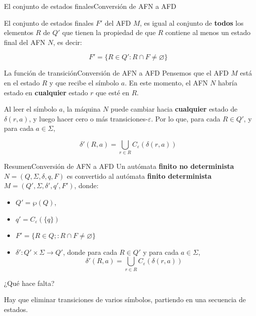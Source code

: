 \documentclass[spanish]{beamer}
\begin{document}
  \begin{frame}{El conjunto de estados finales}{Conversión de AFN a AFD}

    El conjunto de \alert{estados finales} $F'$ del AFD $M$, es igual al conjunto de \textbf{todos} los elementos $R$ de $Q'$ que tienen la propiedad de que $R$ contiene al menos un estado final del AFN $N$, es decir: \pause

    \[F'= \{R \in Q' : R \cap F \neq \varnothing\}\]
      
  \end{frame}

  \begin{frame}{La función de transición}{Conversión de AFN a AFD}
      Pensemos que el AFD $M$ está en el estado $R$ y que recibe el símbolo $a$.
      En este momento, el AFN $N$ habría estado en \textbf{cualquier} estado $r$ que esté en $R$. \pause

      \bigskip

      Al leer el símbolo $a$, la máquina $N$ puede cambiar hacia \textbf{cualquier} estado de $\delta(r,a)$, y luego hacer cero o más transiciones-$\varepsilon$. Por lo que, para cada $R \in Q'$, y para cada $a \in \Sigma$, \pause

      \[ \delta'(R,a) = \bigcup_{r \in R} C_\varepsilon (\delta (r,a)) \]
  \end{frame}

  \begin{frame}{Resumen}{Conversión de AFN a AFD}
      Un autómata \textbf{finito no determinista} $N = (Q, \Sigma, \delta, q, F)$ es convertido al autómata \textbf{finito determinista} $M = (Q', \Sigma, \delta', q', F')$, donde: \pause
      
      \bigskip

      \begin{itemize}
        \itemsep1.5ex
        \item $Q' = \wp(Q)$, \pause
        \item $q'= C_\varepsilon(\{q\})$ \pause
        \item $F' = \{R \in Q; : R \cap F \neq \varnothing\}$ \pause
        \item $\delta' : Q' \times \Sigma \to Q'$, donde para cada $R \in Q'$ y para cada $a \in \Sigma$,
        \[\delta'(R,a) = \bigcup_{r \in R} C_\varepsilon (\delta (r,a))\]
      \end{itemize} \pause

      \bigskip

      ¿Qué hace falta? \pause

      Hay que eliminar transiciones de varios símbolos, partiendo en una secuencia de estados.

  \end{frame}
\end{document}
